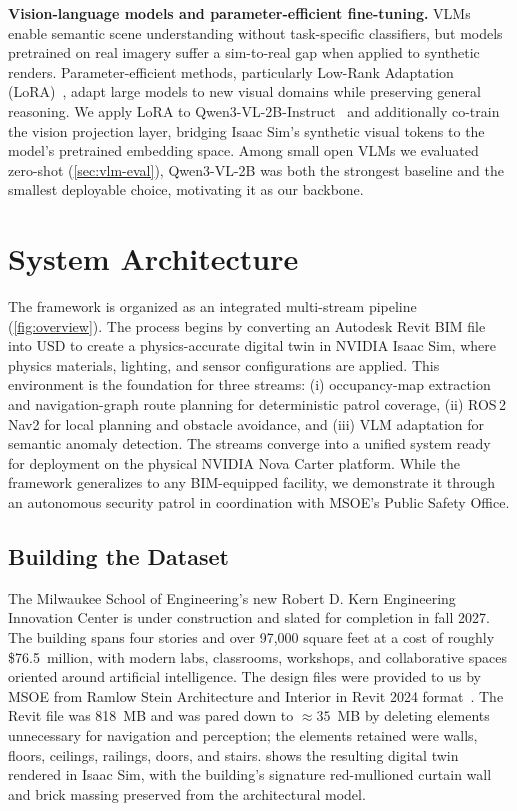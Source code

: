 \documentclass[10pt,twocolumn,letterpaper]{article}
\begin{document}
\noindent\textbf{Vision-language models and parameter-efficient fine-tuning.}
VLMs enable semantic scene understanding without task-specific classifiers, but
models pretrained on real imagery suffer a sim-to-real gap when applied to
synthetic renders. Parameter-efficient methods, particularly Low-Rank Adaptation
(LoRA)~\cite{hu2021lora}, adapt large models to new visual domains while
preserving general reasoning. We apply LoRA to
Qwen3-VL-2B-Instruct~\cite{wang2024qwen2vl} and additionally co-train the vision
projection layer, bridging Isaac Sim's synthetic visual tokens to the model's
pretrained embedding space. Among small open VLMs we evaluated zero-shot
(\cref{sec:vlm-eval}), Qwen3-VL-2B was both the strongest baseline and the
smallest deployable choice, motivating it as our backbone.

\section{System Architecture}

The framework is organized as an integrated multi-stream pipeline
(\cref{fig:overview}). The process begins by converting an Autodesk Revit BIM
file into USD to create a physics-accurate digital twin in NVIDIA Isaac Sim,
where physics materials, lighting, and sensor configurations are applied. This
environment is the foundation for three streams: (i) occupancy-map extraction and
navigation-graph route planning for deterministic patrol coverage, (ii) ROS\,2
Nav2 for local planning and obstacle avoidance, and (iii) VLM adaptation for
semantic anomaly detection. The streams converge into a unified system ready for
deployment on the physical NVIDIA Nova Carter platform. While the framework
generalizes to any BIM-equipped facility, we demonstrate it through an autonomous
security patrol in coordination with MSOE's Public Safety Office.

\subsection{Building the Dataset}

The Milwaukee School of Engineering's new Robert D. Kern Engineering Innovation
Center is under construction and slated for completion in fall 2027. The building
spans four stories and over 97{,}000 square feet at a cost of roughly
\$76.5~million, with modern labs, classrooms, workshops, and collaborative spaces
oriented around artificial intelligence. The design files were provided to us by
MSOE from Ramlow Stein Architecture and Interior in Revit 2024
format~\cite{msoe2026construction}. The Revit file was 818~MB and was pared down
to $\approx35$~MB by deleting elements unnecessary for navigation and perception;
the elements retained were walls, floors, ceilings, railings, doors, and stairs.
 shows the resulting digital twin rendered in Isaac Sim, with the
building's signature red-mullioned curtain wall and brick massing preserved from
the architectural model.
\end{document}
